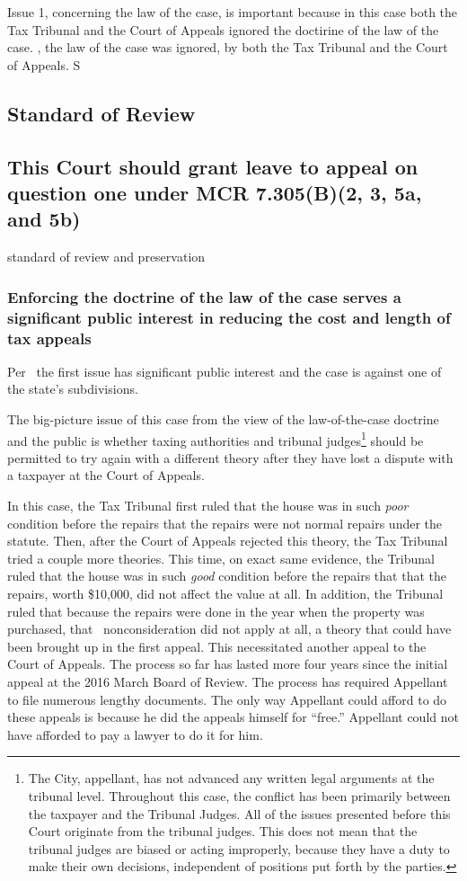 \documentclass[12pt,\documentclassflag]{michiganCourtOfAppealsBrief}
\begin{document}
Issue 1, concerning the law of the case, is important because in this case both the Tax Tribunal and the Court of Appeals ignored the doctirine of the law of the case. , the law of the case was ignored, by both the Tax Tribunal and the Court of Appeals. S
\subsection{Standard of Review}



\subsection{This Court should grant leave to appeal on question one under MCR 7.305(B)(2, 3, 5a, and 5b)}

standard of review and preservation

\subsubsection{Enforcing the doctrine of the law of the case serves a significant public interest in reducing the cost and length of tax appeals}

Per \cite{MCR 7.305(B)(2)}\ the first issue has significant public interest and the case is against one of the state's subdivisions.

The big-picture issue of this case from the view of the law-of-the-case doctrine and the public is whether taxing authorities and tribunal judges\footnote{The City, appellant, has not advanced any written legal arguments at the tribunal level. Throughout this case, the conflict has been primarily between the taxpayer and the Tribunal Judges. All of the issues presented before this Court originate from the tribunal judges. This does not mean that the tribunal judges are biased or acting improperly, because they have a duty to make their own decisions, independent of positions put forth by the parties.} should be permitted to try again with a different theory after they have lost a dispute with a taxpayer at the Court of Appeals.

In this case, the Tax Tribunal first ruled that the house was in such \emph{poor} condition before the repairs that the repairs were not normal repairs under the statute. Then, after the Court of Appeals rejected this theory, the Tax Tribunal tried a couple more theories. This time, on exact same evidence, the Tribunal ruled that the house was in such \emph{good} condition before the repairs that that the repairs, worth \$10,000, did not affect the value at all. In addition, the Tribunal ruled that because the repairs were done in the year when the property was purchased, that \mathieuGast\ nonconsideration did not apply at all, a theory that could have been brought up in the first appeal. This necessitated another appeal to the Court of Appeals. The process so far has lasted more four years since the initial appeal at the 2016 March Board of Review. The process has required Appellant to file numerous lengthy documents. The only way Appellant could afford to do these appeals is because he did the appeals himself for ``free.'' Appellant could not have afforded to pay a lawyer to do it for him.
\end{document}
